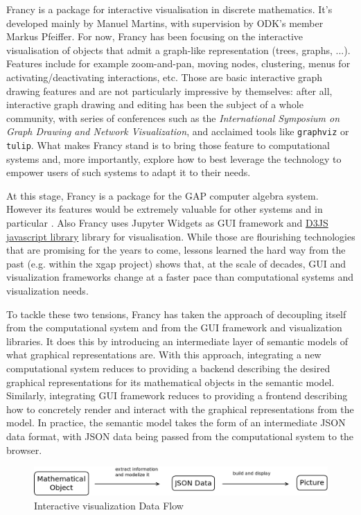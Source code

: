 \documentclass{deliverablereport}
\begin{document}
Francy is a package for interactive visualisation in discrete
mathematics. It's developed mainly by Manuel Martins, with supervision
by ODK's member Markus Pfeiffer. For now, Francy has been focusing on
the interactive visualisation of objects that admit a graph-like
representation (trees, graphs, ...). Features include for example
zoom-and-pan, moving nodes, clustering, menus for
activating/deactivating interactions, etc. Those are basic interactive
graph drawing features and are not particularly impressive by
themselves: after all, interactive graph drawing and editing has been
the subject of a whole community, with series of conferences such as
the \emph{International Symposium on Graph Drawing and Network
  Visualization}, and acclaimed tools like \lstinline{graphviz} or
\lstinline{tulip}. What makes Francy stand is to bring those feature
to computational systems and, more importantly, explore how to best
leverage the technology to empower users of such systems to adapt it
to their needs.

At this stage, Francy is a package for the GAP computer algebra
system. However its features would be extremely valuable for other
systems and in particular \Sage. Also Francy uses Jupyter Widgets as
GUI framework and \href{d3js.org}{D3JS javascript library} library for
visualisation. %
While those are flourishing technologies that are promising for the
years to come, lessons learned the hard way from the past (e.g. within
the xgap project) shows that, at the scale of decades, GUI and
visualization frameworks change at a faster pace than computational
systems and visualization needs.

To tackle these two tensions, Francy has taken the approach of
decoupling itself from the computational system and from the GUI
framework and visualization libraries. It does this by introducing an
intermediate layer of semantic models of what graphical
representations are. With this approach, integrating a new
computational system reduces to providing a backend describing the
desired graphical representations for its mathematical objects in the
semantic model. Similarly, integrating GUI framework reduces to
providing a frontend describing how to concretely render and interact
with the graphical representations from the model. In practice, the
semantic model takes the form of an intermediate JSON data format,
with JSON data being passed from the computational system to the
browser.

\begin{figure}[h]
  \begin{center}
    \includegraphics[width=\textwidth]{schemas/SensUnique}
  \end{center}
  \caption{Interactive visualization Data Flow}
  \label{fig:dataflow1}
\end{figure}
\end{document}
